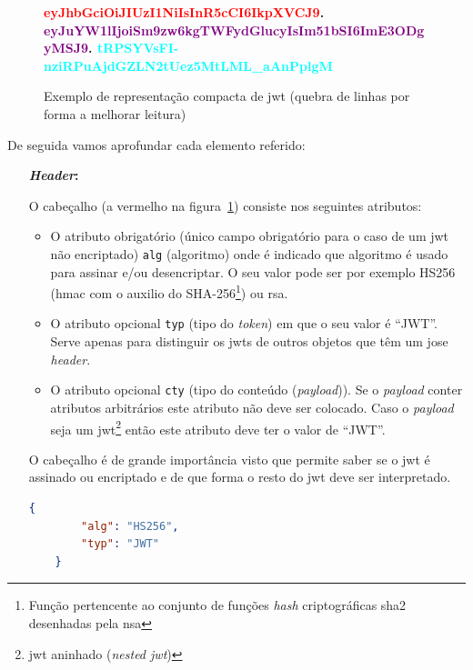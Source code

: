 \begin{figure}[H]
    \centering
    \textbf{\textcolor{red}{eyJhbGciOiJIUzI1NiIsInR5cCI6IkpXVCJ9}.
        \textcolor{purple}{eyJuYW1lIjoiSm9zw6kgTWFydGlucyIsIm51bSI6ImE3ODgyMSJ9}.
        \textcolor{cyan}{tRPSYVsFI-nziRPuAjdGZLN2tUez5MtLML\_aAnPplgM}
    }
    \caption{Exemplo de representação compacta de \acrshort{jwt} (quebra de linhas por forma a melhorar leitura)}\label{fig:exemjwt}
\end{figure}

De seguida vamos aprofundar cada elemento referido:
\begin{itemize}
    \item[\textbf{\textit{Header}:}]

    O cabeçalho (a vermelho na figura~\ref{fig:exemjwt}) consiste nos seguintes atributos:
    \begin{itemize}
        \item O atributo obrigatório (único campo obrigatório para o caso de um \acrshort{jwt} não encriptado) \texttt{alg} (algoritmo) onde é indicado que algoritmo é usado para assinar e/ou desencriptar. O seu valor pode ser por exemplo HS256 (\acrshort{hmac} com o auxilio do SHA-256\footnote{Função pertencente ao conjunto de funções \textit{hash} criptográficas \acrfull{sha2} desenhadas pela \acrshort{nsa}}) ou \acrshort{rsa}.
        \item O atributo opcional \texttt{typ} (tipo do \textit{token}) em que o seu valor é ``JWT''. Serve apenas para distinguir os \acrshort{jwt}s de outros objetos que têm um \acrshort{jose} \textit{header}.
        \item O atributo opcional \texttt{cty} (tipo do conteúdo (\textit{payload})). Se o \textit{payload} conter atributos arbitrários este atributo não deve ser colocado. Caso o \textit{payload} seja um \acrshort{jwt}\footnote{\acrshort{jwt} aninhado (\textit{nested \acrshort{jwt}})} então este atributo deve ter o valor de ``JWT''.
    \end{itemize}

    O cabeçalho é de grande importância visto que permite saber se o \acrshort{jwt} é assinado ou encriptado e de que forma o resto do \acrshort{jwt} deve ser interpretado.

    \begin{lstlisting}[language=json, caption=\textit{Header} usado para construir o \acrshort{jwt} da figura~\ref{fig:exemjwt}]
    {
        "alg": "HS256",
        "typ": "JWT"
    }
    \end{lstlisting}


\end{itemize}
